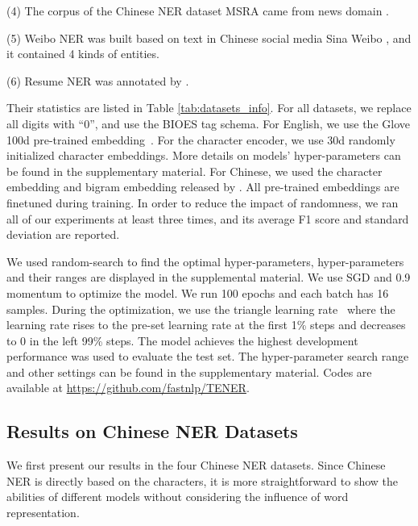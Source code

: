 \documentclass[11pt,a4paper]{article}
\begin{document}
(4) The corpus of the Chinese NER dataset MSRA came from news domain \cite{DBLP:conf/acl-sighan/Levow06}.

(5) Weibo NER was built based on text in Chinese social media Sina Weibo \cite{DBLP:conf/emnlp/PengD15}, and it contained 4 kinds of entities.

(6) Resume NER was annotated by \cite{DBLP:conf/acl/ZhangY18}.

Their statistics are listed in Table \ref{tab:datasets_info}. For all datasets, we replace all digits with ``0'', and use the BIOES tag schema. For English, we use the Glove 100d pre-trained embedding~\cite{pennington2014glove}. For the character encoder, we use 30d randomly initialized character embeddings. More details on models' hyper-parameters can be found in the supplementary material. For Chinese, we used the character embedding and bigram embedding released by \cite{DBLP:conf/acl/ZhangY18}. All pre-trained embeddings are finetuned during training. In order to reduce the impact of randomness, we ran all of our experiments at least three times, and its average F1 score and standard deviation are reported.

We used random-search to find the optimal hyper-parameters, hyper-parameters and their ranges are displayed in the supplemental material. We use SGD and 0.9 momentum to optimize the model. We run 100 epochs and each batch has 16 samples. During the optimization, we use the triangle learning rate~\cite{DBLP:conf/wacv/Smith17} where the learning rate rises to the pre-set learning rate at the first 1\% steps and decreases to 0 in the left 99\% steps. The model achieves the highest development performance was used to evaluate the test set. The hyper-parameter search range and other settings can be found in the supplementary material. Codes are available at \url{https://github.com/fastnlp/TENER}.

\subsection{Results on Chinese NER Datasets}


We first present our results in the four Chinese NER datasets. Since Chinese NER is directly based on the characters, it is more straightforward to show the abilities of different models without considering the influence of word representation.
\end{document}
